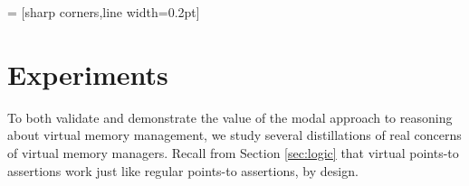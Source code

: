 \newcommand{\sumwalkabsent}{
  \ownGhost\gammaPred{\authfrag{\singletonMap{\texttt{entry+KERNBASE}}{(\textsf{qfrac}, \textsf{entry})}}}
}


\newcommand{\ventry}{\texttt{entry + KERNBASE}}
\newcommand{\entry}{\texttt{entry}}
\newcommand{\qfraczero}{\textsf{qfrac}}
\newcommand{\true}{\textsf{true}}
 = [sharp corners,line width=0.2pt]
\NewDocumentCommand {}
\newcommand*{\knowInvpv}[2]{\boxedassertpv{#2}[#1]}
\newcommand*{\ownGhostpv}[2]{\boxedassertpv[dash dot]{#2}[#1]}

\newcommand{\sumpv}[3]{
  \ownGhostpv\gammaPred{\authfrag{\singletonMap{#1}{(#2, #3)}}}
}

\newcommand{\pvmapping}[1]{\mathcal{A}\textsf{PVMappings}(#1)}


\newcommand{\fpaddr}{\texttt{fpaddr}}
\newcommand{\specline}[1]{{\color{blue}\left\{#1\right\}}}
\newcommand{\sumapacesfull}[2]{
  \ownGhost\gammaPreds{\authfull{\singletonMap{#1}{#2}}}
}
\section{Experiments}
\label{sec:experiment}
To both validate and demonstrate the value of the modal approach to reasoning about virtual memory management, we study several
distillations of real concerns of virtual memory managers.
Recall from Section \ref{sec:logic} that virtual points-to assertions work just like regular points-to assertions, by design.


